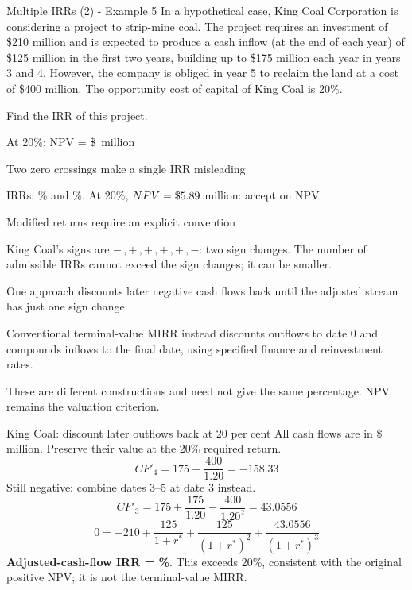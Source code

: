 \documentclass[9pt,aspectratio=169]{beamer}
\newenvironment{wideitemize}{\itemize\addtolength{\itemsep}{10pt}}{\enditemize}
\begin{document}
\begin{frame}{Multiple IRRs (2) - Example 5}
In a hypothetical case, King Coal Corporation is considering a project to strip-mine coal. The project requires an investment of \$210 million and is expected to produce a cash inflow (at the end of each year) of \$125 million in the first two years, building up to \$175 million each year in years 3 and 4. However, the company is obliged in year 5 to reclaim the land at a cost of \$400 million. The opportunity cost of capital of King Coal is 20\%.

Find the IRR of this project.

At 20\%: NPV = \$\CoalNPV\ million
\end{frame}

\begin{frame}{Two zero crossings make a single IRR misleading}
\begin{center}\end{center}
IRRs: \CoalLowIRR\% and \CoalHighIRR\%. At 20\%, $NPV=\$5.89$ million: accept on NPV.
\end{frame}

\begin{frame}{Modified returns require an explicit convention}
\begin{wideitemize}
\item King Coal's signs are $-\,,+\,,+\,,+\,,+\,,-$: two sign changes. The number of admissible IRRs cannot exceed the sign changes; it can be smaller.
\item One approach discounts later negative cash flows back until the adjusted stream has just one sign change.
\item Conventional terminal-value MIRR instead discounts outflows to date 0 and compounds inflows to the final date, using specified finance and reinvestment rates.
\item These are different constructions and need not give the same percentage. NPV remains the valuation criterion.
\end{wideitemize}
\end{frame}

\begin{frame}{King Coal: discount later outflows back at 20 per cent}
All cash flows are in \$ million. Preserve their value at the 20\% required return.
\[
CF'_4=175-\frac{400}{1.20}=-158.33
\]
Still negative: combine dates 3--5 at date 3 instead.
\[
CF'_3=175+\frac{175}{1.20}-\frac{400}{1.20^2}=43.0556
\]
\[
0=-210+\frac{125}{1+r^*}+\frac{125}{(1+r^*)^2}+\frac{43.0556}{(1+r^*)^3}
\]
\textbf{Adjusted-cash-flow IRR = \CoalAdjustedIRR\%}. This exceeds 20\%, consistent with the original positive NPV; it is not the terminal-value MIRR.
\end{frame}
\end{document}
